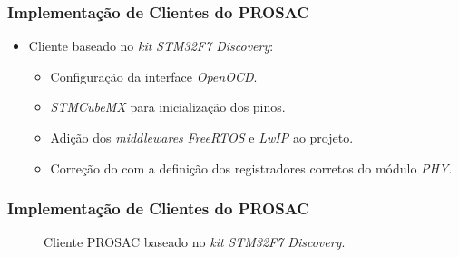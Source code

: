 \begin{frame}
\frametitle {Implementação de Clientes do PROSAC}

\begin{itemize}
  \item Cliente baseado no \textit{kit} \textit{STM32F7 Discovery}:	
  
  \begin{itemize} 
  \item Configuração da interface \textit{OpenOCD}.
  \item \textit{STMCubeMX} para inicialização dos pinos.
  \item Adição dos \textit{middlewares} \textit{FreeRTOS} e \textit{LwIP} ao
  projeto.
  \item Correção do  com a definição dos
  registradores corretos do módulo \textit{PHY}.
  \end{itemize}
\end{itemize}

\vspace{-12pt}

\frametitle {Implementação de Clientes do PROSAC}
\begin{figure}[h]
\centering
{}
%
\vspace{-12pt}
\caption {Cliente PROSAC baseado no \textit{kit} \textit{STM32F7 Discovery}.}
\label{fig:stm32}
\end{figure}

\end{frame}